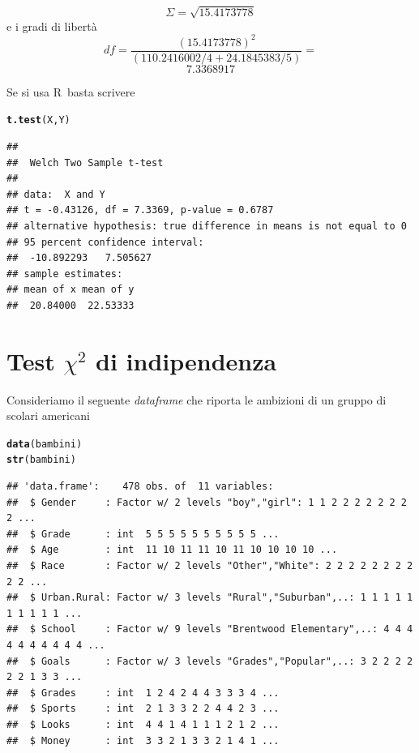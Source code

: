 \documentclass[onecolumn,12pt]{book}\usepackage[]{graphicx}\usepackage[]{color}
\makeatletter
\newcommand{\hlstd}[1]{\textcolor[rgb]{0.345,0.345,0.345}{#1}}%
\newcommand{\hlkwd}[1]{\textcolor[rgb]{0.737,0.353,0.396}{\textbf{#1}}}%
\newenvironment{kframe}{%
 \def\at@end@of@kframe{}%
 \ifinner\ifhmode%
  \def\at@end@of@kframe{\end{minipage}}%
  \begin{minipage}{\columnwidth}%
 \fi\fi%
 \def\FrameCommand##1{\hskip\@totalleftmargin \hskip-\fboxsep
 \colorbox{shadecolor}{##1}\hskip-\fboxsep
     \hskip-\linewidth \hskip-\@totalleftmargin \hskip\columnwidth}%
 \MakeFramed {\advance\hsize-\width
   \@totalleftmargin\z@ \linewidth\hsize
   \@setminipage}}%
 {\par\unskip\endMakeFramed%
 \at@end@of@kframe}
\newenvironment{knitrout}{}{} %
\newcommand{\rpr}{\textsf{R}~}
\makeatother
\begin{document}
\[ \Sigma= \sqrt{15.4173778}\]
e i gradi di libertà  
\[ df =\dfrac
{  (15.4173778)^2}
{
(110.2416002/4+
24.1845383/5)
}= \]
\[
  7.3368917
\]

Se si usa  \rpr basta scrivere

\begin{knitrout}
\color{fgcolor}\begin{kframe}
\begin{alltt}
\hlkwd{t.test}\hlstd{(X,Y)}
\end{alltt}
\begin{verbatim}
## 
## 	Welch Two Sample t-test
## 
## data:  X and Y
## t = -0.43126, df = 7.3369, p-value = 0.6787
## alternative hypothesis: true difference in means is not equal to 0
## 95 percent confidence interval:
##  -10.892293   7.505627
## sample estimates:
## mean of x mean of y 
##  20.84000  22.53333
\end{verbatim}
\end{kframe}
\end{knitrout}

\section{Test $\chi^2$  di indipendenza}

Consideriamo il seguente \emph{dataframe} che riporta le ambizioni di un gruppo di scolari americani
\begin{knitrout}
\color{fgcolor}\begin{kframe}
\begin{alltt}
\hlkwd{data}\hlstd{(bambini)}
\hlkwd{str}\hlstd{(bambini)}
\end{alltt}
\begin{verbatim}
## 'data.frame':	478 obs. of  11 variables:
##  $ Gender     : Factor w/ 2 levels "boy","girl": 1 1 2 2 2 2 2 2 2 2 ...
##  $ Grade      : int  5 5 5 5 5 5 5 5 5 5 ...
##  $ Age        : int  11 10 11 11 10 11 10 10 10 10 ...
##  $ Race       : Factor w/ 2 levels "Other","White": 2 2 2 2 2 2 2 2 2 2 ...
##  $ Urban.Rural: Factor w/ 3 levels "Rural","Suburban",..: 1 1 1 1 1 1 1 1 1 1 ...
##  $ School     : Factor w/ 9 levels "Brentwood Elementary",..: 4 4 4 4 4 4 4 4 4 4 ...
##  $ Goals      : Factor w/ 3 levels "Grades","Popular",..: 3 2 2 2 2 2 2 1 3 3 ...
##  $ Grades     : int  1 2 4 2 4 4 3 3 3 4 ...
##  $ Sports     : int  2 1 3 3 2 2 4 4 2 3 ...
##  $ Looks      : int  4 4 1 4 1 1 1 2 1 2 ...
##  $ Money      : int  3 3 2 1 3 3 2 1 4 1 ...
\end{verbatim}
\end{kframe}
\end{knitrout}
\end{document}
